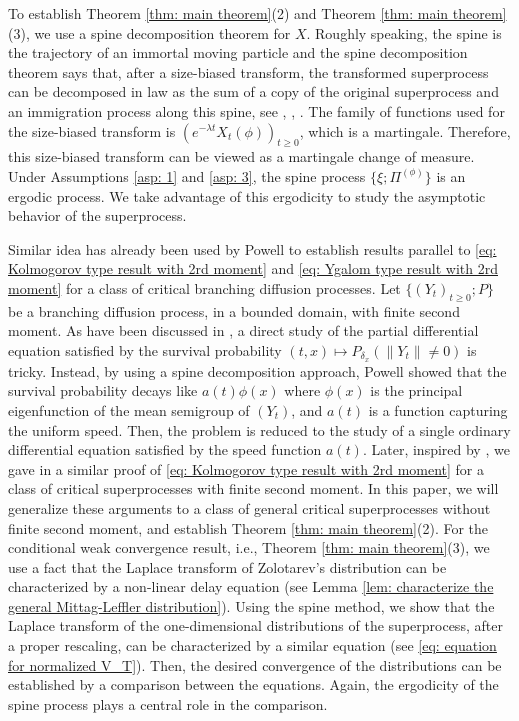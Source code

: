 \documentclass[12pt, a4paper]{amsart}
\theoremstyle{definition}
\numberwithin{equation}{section}
\begin{document}
	To establish Theorem \ref{thm: main theorem}(2) and Theorem \ref{thm: main theorem}(3), we use a spine decomposition theorem for 
	$X$.
	Roughly speaking, the spine is the trajectory of an immortal moving particle and the spine decomposition theorem says that, after a size-biased transform, the transformed superprocess can be decomposed in law as the sum of a copy of the original superprocess and an immigration process along this spine, see \cite{EckhoffKyprianouWinkel2015Spines}, \cite{EnglanderKyprianou2004Local}, \cite{LiuRenSong2009Llog}.
	The family of functions used for the size-biased transform is $(e^{-\lambda t} X_t(\phi))_{t\geq 0}$, which is a martingale.
	Therefore, this size-biased transform can be viewed as a martingale change of measure.
	Under Assumptions \ref{asp: 1} and \ref{asp: 3}, the spine process $\{\xi; \Pi^{(\phi)}\}$ is an ergodic process.
	We take advantage of this ergodicity to study the asymptotic behavior of the superprocess.
	
	Similar idea has already been used by Powell \cite{Powell2015An-invariance} to establish results parallel to \eqref{eq: Kolmogorov type result with 2rd moment} and \eqref{eq: Ygalom type result with 2rd moment} for a class of critical branching diffusion processes.
    Let $\{(Y_t)_{t\geq 0}; P\}$ be a branching diffusion process, in a bounded domain,  with finite second moment.
	As have been discussed in \cite{Powell2015An-invariance}, a direct study of the partial differential equation satisfied by the survival probability $(t,x) \mapsto P_{\delta_x}(\|Y_t\| \neq 0)$ is tricky.
	Instead, by using a spine decomposition approach, Powell \cite{Powell2015An-invariance} showed that the survival probability decays like $a(t)\phi(x)$ where $\phi(x)$ is the principal eigenfunction of the mean semigroup of $(Y_t)$, and $a(t)$ is a function capturing the uniform speed.
	Then, the problem is reduced to the study of a single ordinary differential equation satisfied by the speed function $a(t)$.
	Later, inspired by \cite{Powell2015An-invariance}, we gave in \cite{RenSongSun2017Spine} a similar proof of \eqref{eq: Kolmogorov type result with 2rd moment} for a class of critical superprocesses with finite second moment.
	In this paper, we will  generalize these arguments to a class of general critical superprocesses without finite second moment, and establish Theorem \ref{thm: main theorem}(2).
	For the conditional weak convergence result, i.e., Theorem \ref{thm: main theorem}(3), we use a fact that the Laplace transform of Zolotarev's distribution can be characterized by a non-linear delay equation (see Lemma \ref{lem: characterize the general Mittag-Leffler distribution}).
	Using the spine method, we show that the Laplace transform of the one-dimensional distributions of the superprocess, after a proper rescaling, can be 	characterized by a similar equation (see \eqref{eq: equation for normalized V_T}).
	Then, the desired convergence of the distributions can be established by a comparison between the equations.	
	Again, the ergodicity of the spine process plays a central role in the comparison.
	
\end{document}
